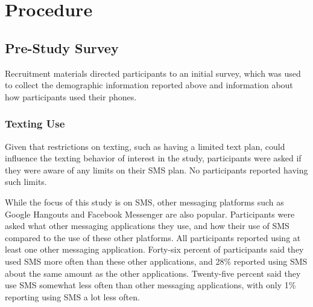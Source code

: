 \documentclass[12pt]{nuthesis}	%
\begin{document}
\section{Procedure}

\subsection{Pre-Study Survey}

Recruitment materials directed participants to an initial survey, which was used to collect the demographic information reported above and information about how participants used their phones.

\subsubsection{Texting Use}
Given that restrictions on texting, such as having a limited text plan, could influence the texting behavior of interest in the study, participants were asked if they were aware of any limits on their SMS plan. No participants reported having such limits.

While the focus of this study is on SMS, other messaging platforms such as Google Hangouts and Facebook Messenger are also popular. Participants were asked what other messaging applications they use, and how their use of SMS compared to the use of these other platforms. All participants reported using at least one other messaging application. Forty-six percent of participants said they used SMS more often than these other applications, and 28\% reported using SMS about the same amount as the other applications. Twenty-five percent said they use SMS somewhat less often than other messaging applications, with only 1\% reporting using SMS a lot less often.

\end{document}
